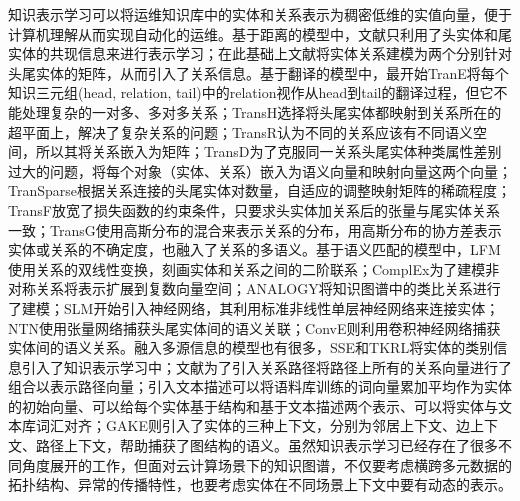 知识表示学习可以将运维知识库中的实体和关系表示为稠密低维的实值向量，便于计算机理解从而实现自动化的运维。基于距离的模型中，文献\cite{bordes2012joint}只利用了头实体和尾实体的共现信息来进行表示学习；在此基础上文献\cite{bordes2011learning}将实体关系建模为两个分别针对头尾实体的矩阵，从而引入了关系信息。基于翻译的模型中，最开始TranE\cite{bordes2013translatingE}将每个知识三元组(head, relation, tail)中的relation视作从head到tail的翻译过程，但它不能处理复杂的一对多、多对多关系；TransH\cite{wang2014knowledge}选择将头尾实体都映射到关系所在的超平面上，解决了复杂关系的问题；TransR\cite{lin2015learning}认为不同的关系应该有不同语义空间，所以其将关系嵌入为矩阵；TransD\cite{ji2015knowledge}为了克服同一关系头尾实体种类属性差别过大的问题，将每个对象（实体、关系）嵌入为语义向量和映射向量这两个向量；TranSparse\cite{ji2016knowledge}根据关系连接的头尾实体对数量，自适应的调整映射矩阵的稀疏程度；TransF\cite{feng2016knowledge}放宽了损失函数的约束条件，只要求头实体加关系后的张量与尾实体关系一致；TransG\cite{ou2016asymmetric}使用高斯分布的混合来表示关系的分布，用高斯分布的协方差表示实体或关系的不确定度，也融入了关系的多语义。基于语义匹配的模型中，LFM\cite{jenatton2012latent}使用关系的双线性变换，刻画实体和关系之间的二阶联系；ComplEx\cite{trouillon2016complex}为了建模非对称关系将表示扩展到复数向量空间；ANALOGY\cite{liu2017analogical}将知识图谱中的类比关系进行了建模；SLM\cite{socher2013reasoning}开始引入神经网络，其利用标准非线性单层神经网络来连接实体；NTN\cite{socher2013reasoning}使用张量网络捕获头尾实体间的语义关联；ConvE\cite{dettmers2018convolutional}则利用卷积神经网络捕获实体间的语义关系。融入多源信息的模型也有很多，SSE\cite{guo2015semantically}和TKRL\cite{xie2016representation}将实体的类别信息引入了知识表示学习中；文献\parencite{lin2015modeling}为了引入关系路径将路径上所有的关系向量进行了组合以表示路径向量；引入文本描述可以将语料库训练的词向量累加平均作为实体的初始向量\cite{socher2013reasoning}、可以给每个实体基于结构和基于文本描述两个表示\cite{xie2016representation}、可以将实体与文本库词汇对齐\cite{wang2016text}；GAKE则引入了实体的三种上下文，分别为邻居上下文、边上下文、路径上下文，帮助捕获了图结构的语义。虽然知识表示学习已经存在了很多不同角度展开的工作，但面对云计算场景下的知识图谱，不仅要考虑横跨多元数据的拓扑结构、异常的传播特性，也要考虑实体在不同场景上下文中要有动态的表示。

